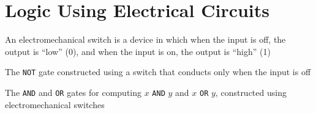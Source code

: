 \documentclass[8pt,a4paper,compress]{beamer}
\begin{document}
\section{Logic Using Electrical Circuits}
\begin{frame}[fragile]
\pause

An electromechanical switch is a device in which when the input is off, the output is ``low'' (0), and when the input is on, the output is ``high'' (1)
\begin{center}
\end{center}

\pause
\bigskip

The \lstinline{NOT} gate constructed using a switch that conducts only when the input is off
\begin{center}
\end{center}

\pause
\bigskip

The \lstinline{AND} and \lstinline{OR} gates for computing $x$ \lstinline{AND} $y$ and $x$ \lstinline{OR} $y$, constructed using electromechanical switches
\begin{center}
\end{center}
\end{frame}
\end{document}
